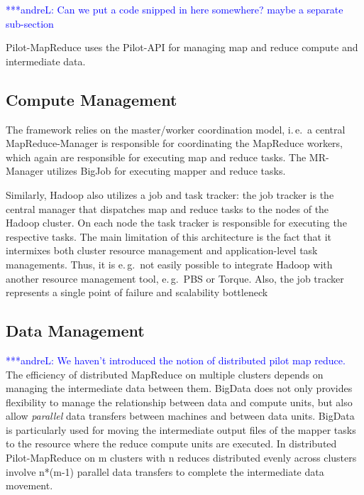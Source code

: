 \documentclass{acm_proc_article-sp}
\newcommand{\alnote}[1]{ {\textcolor{blue} { ***andreL: #1 }}}
\newcommand{\alnote}[1]{}
\newcommand{\pilotmapreduce}{Pilot-MapReduce\xspace}
\begin{document}
\alnote{Can we put a code snipped in here somewhere? maybe a separate sub-section}

\pilotmapreduce uses the Pilot-API for managing map and reduce compute and intermediate data.


\subsection{Compute Management}
The framework relies on the master/worker
coordination model, i.\,e.\ a central MapReduce-Manager is responsible for
coordinating the MapReduce workers, which again are responsible for executing
map and reduce tasks. The MR-Manager utilizes BigJob for executing
mapper and reduce tasks. 

Similarly, Hadoop also utilizes a job and task tracker: the job tracker is the
central manager that dispatches map and reduce tasks to the nodes of the
Hadoop cluster. On each node the task tracker is responsible for executing the
respective tasks. The main limitation of this architecture is the fact that it
intermixes both cluster resource management and application-level task
managements. Thus, it is e.\,g.\ not easily possible to integrate Hadoop with
another resource management tool, e.\,g.\ PBS or Torque. Also, the job tracker
represents a single point of failure and scalability bottleneck

\subsection{Data Management}
\alnote{We haven't introduced the notion of distributed pilot map reduce.}
The efficiency of distributed MapReduce on multiple clusters depends on managing the
intermediate data between them. BigData does not only provides flexibility to manage the
relationship between data and compute units, but also allow {\it parallel} data transfers
between machines and between data units. BigData is particularly used for moving the
intermediate output files of the mapper tasks to the resource where the reduce compute
units are executed. In distributed \pilotmapreduce on m clusters with n reduces distributed
evenly across clusters involve n*(m-1) parallel data transfers to complete the intermediate
data movement.
\end{document}
